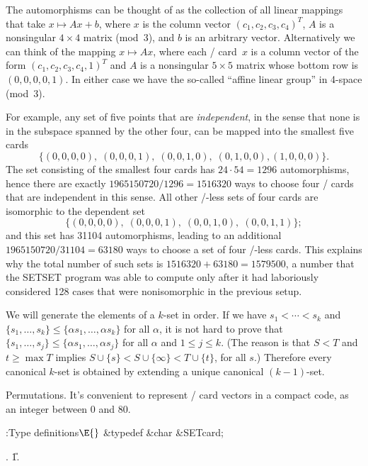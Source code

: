 The automorphisms can be thought of as the collection of
all linear
mappings that take $x\mapsto Ax+b$, where $x$ is the column vector
$(c_1,c_2,c_3,c_4)^T$, $A$ is a nonsingular $4\times4$
matrix (mod~3), and $b$ is an arbitrary vector. Alternatively we can
think of the mapping $x\mapsto Ax$, where each \SET/ card~$x$ is a
column vector of the form $(c_1,c_2,c_3,c_4,1)^T$
and $A$ is a nonsingular $5\times5$ matrix whose bottom row is $(0,0,0,0,1)$.
In either case
we have the so-called ``affine linear group'' in 4-space (mod~3).

For example, any set of five points that are {\it independent}, in the
sense that none is in the subspace spanned by the other four, can be
mapped into the smallest five cards
$$\{(0,0,0,0),\;(0,0,0,1),\;(0,0,1,0),\;(0,1,0,0),(1,0,0,0)\}.$$
The set consisting of the smallest four cards has $24\cdot54=1296$
automorphisms, hence there are exactly $1965150720/1296=1516320$ ways to
choose four \SET/ cards that are independent in this sense.
All other \SET/-less sets of four cards are isomorphic to the dependent set
$$\{(0,0,0,0),\;(0,0,0,1),\;(0,0,1,0),\;(0,0,1,1)\};$$
and this set has 31104 automorphisms, leading to an additional
$1965150720/31104=63180$ ways to choose a set of four \SET/-less cards.
This explains why the total number of such sets is $1516320+63180=1579500$,
a number that the {\mc SETSET} program was able to compute only after
it had laboriously considered 128 cases that were nonisomorphic
in the previous setup.

\fi

We will generate the elements of a $k$-set in order. If
we have
$s_1<\cdots<s_k$ and $\{s_1,\ldots,s_k\}\le\{\alpha s_1,\ldots,\alpha s_k\}$
for all $\alpha$, it is not hard to prove that $\{s_1,\ldots,s_j\}\le\{\alpha
s_1,\ldots,\alpha s_j\}$ for all $\alpha$ and $1\le j\le k$.
(The reason is that $S<T$ and $t\ge\max T$ implies
$S\cup\{s\}<S\cup\{\infty\}<T\cup\{t\}$, for all $s$.)
Therefore every canonical $k$-set is obtained by extending a unique
canonical $(k-1)$-set.

\fi

Permutations.
It's convenient to represent \SET/ card vectors in a compact code,
as an integer between 0 and 80.

\Y\B\4:Type definitions\X${}\E{}$\6
\&{typedef} \&{char} \&{SETcard};\par
{}.
\U1.\fi

